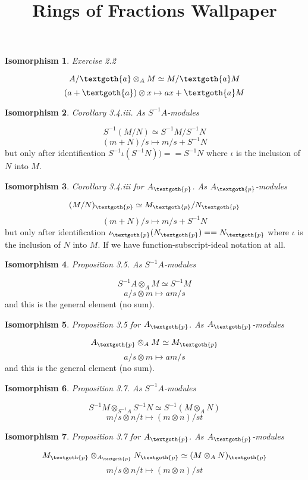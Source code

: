 \documentclass{article}
\title{Rings of Fractions Wallpaper}
\newtheorem{theorem}{Isomorphism}
\begin{document}
\maketitle

\begin{theorem}
Exercise 2.2
\end{theorem}

\[
A/\textgoth{a} \otimes_A M \simeq M/\textgoth{a}M
\]
\[
(a + \textgoth{a}) \otimes x \mapsto ax + \textgoth{a}M
\]

\vspace{10px}
\begin{theorem}
Corollary 3.4.iii. As $S^{-1}A$-modules
\end{theorem}

\[
S^{-1}(M/N) \simeq S^{-1}M/S^{-1}N
\]
\[
(m + N) / s \mapsto m/s + S^{-1}N 
\]
\noindent
but only after identification $S^{-1}\iota(S^{-1}N)) == S^{-1}N$ where $\iota$ is the inclusion of $N$ into $M$.

\vspace{10px}
\begin{theorem}
Corollary 3.4.iii for $A_\textgoth{p}$. As $A_\textgoth{p}$-modules
\end{theorem}

\[
(M/N)_\textgoth{p} \simeq M_\textgoth{p}/N_\textgoth{p}
\]
\[
(m + N) / s \mapsto m/s + S^{-1}N 
\]
\noindent
but only after identification $\iota_\textgoth{p}(N_\textgoth{p}) == N_\textgoth{p}$ where $\iota$ is the inclusion of $N$ into $M$. If we have function-subscript-ideal notation at all.
 
\vspace{10px}
\begin{theorem}
Proposition 3.5. As $S^{-1}A$-modules
\end{theorem}

\[
S^{-1}A \otimes_A M \simeq S^{-1}M
\]
\[
a/s \otimes m \mapsto am/s
\]
\noindent
and this is the general element (no sum).

\vspace{10px}
\begin{theorem}
Proposition 3.5 for $A_\textgoth{p}$. As $A_\textgoth{p}$-modules

\end{theorem}

\[
A_\textgoth{p} \otimes_A M \simeq M_\textgoth{p}
\]
\[
a/s \otimes m \mapsto am/s
\]
\noindent
and this is the general element (no sum).

\vspace{10px}
\begin{theorem}
Proposition 3.7. As $S^{-1}A$-modules
\end{theorem}

\[
S^{-1}M \otimes_{S^{-1}A} S^{-1}N \simeq  S^{-1}(M \otimes_A N)
\]
\[
m/s \otimes n/t \mapsto (m \otimes n)/st
\]

\vspace{10px}
\begin{theorem}
Proposition 3.7 for $A_\textgoth{p}$. As $A_\textgoth{p}$-modules
\end{theorem}

\[
M_\textgoth{p} \otimes_{A_\textgoth{p}} N_\textgoth{p} \simeq  (M \otimes_A N)_\textgoth{p}
\]
\[
m/s \otimes n/t \mapsto (m \otimes n)/st
\]
\end{document}
